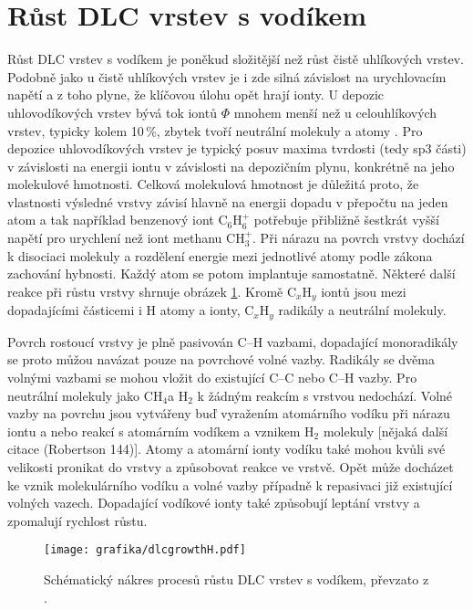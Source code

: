 \section{Růst DLC vrstev s vodíkem}
Růst DLC vrstev s vodíkem je poněkud složitější než růst čistě uhlíkových vrstev. Podobně jako u čistě uhlíkových vrstev je i zde silná závislost na urychlovacím napětí a z toho plyne, že klíčovou úlohu opět hrají ionty. U depozic uhlovodíkových vrstev bývá tok iontů $\Phi$ mnohem menší než u celouhlíkových vrstev, typicky kolem 10\,\%, zbytek tvoří neutrální molekuly a atomy \cite{Koidl1991}. Pro depozice uhlovodíkových vrstev je typický posuv maxima tvrdosti (tedy sp3 části) v závislosti na energii iontu v závislosti na depozičním plynu, konkrétně na jeho molekulové hmotnosti. 
Celková molekulová hmotnost je důležitá proto, že vlastnosti výsledné vrstvy závisí hlavně na energii dopadu v přepočtu na jeden atom a tak například benzenový iont C$_6$H$_6^+$ potřebuje přibližně šestkrát vyšší napětí pro urychlení než iont methanu CH$_3^+$. Při nárazu na povrch vrstvy dochází k disociaci molekuly a rozdělení energie mezi jednotlivé atomy podle zákona zachování hybnosti. Každý atom se potom implantuje samostatně. Některé další reakce při růstu vrstvy shrnuje obrázek \ref{dlcgrowthH}. Kromě C$_x$H$_y$ iontů jsou mezi dopadajícími částicemi i H atomy a ionty, C$_x$H$_y$ radikály a neutrální molekuly.

Povrch rostoucí vrstvy je plně pasivován C--H vazbami, dopadající monoradikály se proto můžou navázat pouze na povrchové volné vazby. Radikály se dvěma volnými vazbami se mohou vložit do existující C--C nebo C--H vazby. Pro neutrální molekuly jako CH$_4$a H$_2$ k žádným reakcím s vrstvou nedochází. Volné vazby na povrchu jsou vytvářeny buď vyražením atomárního vodíku při nárazu iontu a nebo reakcí s atomárním vodíkem a vznikem H$_2$ molekuly [nějaká další citace (Robertson 144)]. Atomy a atomární ionty vodíku také mohou kvůli své velikosti pronikat do vrstvy a způsobovat reakce ve vrstvě. Opět může docházet ke vznik molekulárního vodíku a volné vazby případně k repasivaci již existující volných vazech. Dopadající vodíkové ionty také způsobují leptání vrstvy a zpomalují rychlost růstu.

\begin{figure}[htbp]
  \centering
  \texttt{[image: grafika/dlcgrowthH.pdf]}
  \caption{Schématický nákres procesů růstu DLC vrstev s vodíkem, převzato z \cite{Robertson2002}.}
  \label{dlcgrowthH}
\end{figure}

